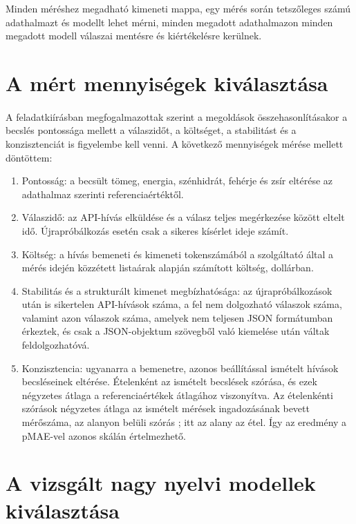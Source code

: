 Minden méréshez megadható kimeneti mappa, egy mérés során tetszőleges számú adathalmazt és modellt lehet mérni, minden megadott adathalmazon minden megadott modell
válaszai mentésre és kiértékelésre kerülnek.

\section{A mért mennyiségek kiválasztása}
\label{sec:mert_mennyisegek}
\paragraph{}A feladatkiírásban megfogalmazottak szerint a megoldások összehasonlításakor a becslés pontossága mellett a válaszidőt, a költséget, a stabilitást és a konzisztenciát is figyelembe kell venni. A következő mennyiségek mérése mellett döntöttem:
\begin{enumerate}
    \item Pontosság: a becsült tömeg, energia, szénhidrát, fehérje és zsír eltérése az
    adathalmaz szerinti referenciaértéktől.
    \item Válaszidő: az API-hívás elküldése és a válasz teljes megérkezése között eltelt idő.
    Újrapróbálkozás esetén csak a sikeres kísérlet ideje számít.
    \item Költség: a hívás bemeneti és kimeneti tokenszámából a szolgáltató által a mérés
    idején közzétett listaárak alapján számított költség, dollárban.
    \item Stabilitás és a strukturált kimenet megbízhatósága: az újrapróbálkozások után is sikertelen
    API-hívások száma, a fel nem dolgozható válaszok száma, valamint azon válaszok száma, amelyek nem teljesen JSON formátumban érkeztek, 
    és csak a JSON-objektum szövegből való kiemelése után váltak feldolgozhatóvá.
    \item Konzisztencia: ugyanarra a bemenetre, azonos beállítással ismételt hívások
    becsléseinek eltérése. Ételenként az ismételt becslések szórása, és ezek
    négyzetes átlaga a referenciaértékek átlagához viszonyítva. Az ételenkénti szórások 
    négyzetes átlaga az ismételt mérések ingadozásának bevett mérőszáma, az alanyon belüli 
    szórás \cite{bland1996measurement}; itt az alany az étel. Így az eredmény a pMAE-vel
    azonos skálán értelmezhető.
\end{enumerate}


\section{A vizsgált nagy nyelvi modellek kiválasztása}
